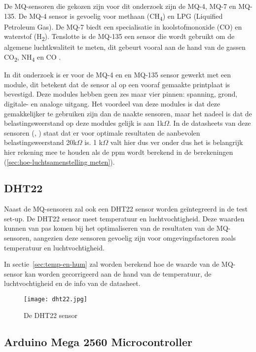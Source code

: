 De MQ-sensoren die gekozen zijn voor dit onderzoek zijn de MQ-4, MQ-7 en MQ-135. De MQ-4 sensor is gevoelig voor methaan (CH\textsubscript{4}) en LPG (Liquified Petroleum Gas). De MQ-7 biedt een specialisatie in koolstofmonoxide (CO) en waterstof (H\textsubscript{2}). Tenslotte is de MQ-135 een sensor die wordt gebruikt om de algemene luchtkwaliteit te meten, dit gebeurt vooral aan de hand van de gassen CO\textsubscript{2}, NH\textsubscript{4} en CO \autocite{RC2022}.

In dit onderzoek is er voor de MQ-4 en en MQ-135 sensor gewerkt met een module, dit betekent dat de sensor al op een vooraf gemaakte printplaat is bevestigd. Deze modules hebben geen zes maar vier pinnen: spanning, grond, digitale- en analoge uitgang. Het voordeel van deze modules is dat deze gemakkelijker te gebruiken zijn dan de naakte sensoren, maar het nadeel is dat de belastingsweerstand op deze modules gelijk is aan 1k$\Omega$. In de datasheets van deze sensoren (\autocite{mq135}, \autocite{mq4}) staat dat er voor optimale resultaten de aanbevolen belastingsweerstand 20k$\Omega$ is. 1 k$\Omega$ valt hier dus ver onder dus het is belangrijk hier rekening mee te houden als de ppm wordt berekend in de berekeningen (\ref{sec:hoe-luchtsamenstelling meten}).


\subsection{DHT22}%
\label{subsec:dht22}

Naast de MQ-sensoren zal ook een DHT22 sensor worden geïntegreerd in de test set-up. De DHT22 sensor meet temperatuur en luchtvochtigheid. Deze waarden kunnen van pas komen bij het optimaliseren van de resultaten van de MQ-sensoren, aangezien deze sensoren gevoelig zijn voor omgevingsfactoren zoals temperatuur en luchtvochtigheid.

In sectie~\ref{sec:temp-en-hum} zal worden berekend hoe de waarde van de MQ-sensor kan worden gecorrigeerd aan de hand van de temperatuur, de luchtvochtigheid en de info van de datasheet.

\begin{figure}[h]
    \texttt{[image: dht22.jpg]}
    \caption[DHT22 sensor]{De DHT22 sensor}
    \label{fig:dht22}
\end{figure}


\subsection{Arduino Mega 2560 Microcontroller}%
\label{subsec:arduino}

